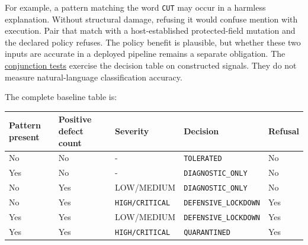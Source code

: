\documentclass[
  11pt,
]{article}
\newcommand{\passthrough}[1]{#1}
\begin{document}
For example, a pattern matching the word \passthrough{\lstinline!CUT!}
may occur in a harmless explanation. Without structural damage, refusing
it would confuse mention with execution. Pair that match with a
host-established protected-field mutation and the declared policy
refuses. The policy benefit is plausible, but whether these two inputs
are accurate in a deployed pipeline remains a separate obligation. The
\href{https://github.com/dbccpage/the_symbol_game/blob/52cb5457f6c485ba548cfd292f6012a941ed22cf/pfp/tests/mssn_sn_demos/test_demo_immune_strict.py}{conjunction
tests} exercise the decision table on constructed signals. They do not
measure natural-language classification accuracy.

The complete baseline table is:

\begin{longtable}[]{@{}
  >{\raggedright\arraybackslash}p{}
  >{\raggedright\arraybackslash}p{}
  >{\raggedright\arraybackslash}p{}
  >{\raggedright\arraybackslash}p{}
  >{\raggedright\arraybackslash}p{}@{}}
\toprule\noalign{}
\begin{minipage}[b]{\linewidth}\raggedright
Pattern present
\end{minipage} & \begin{minipage}[b]{\linewidth}\raggedright
Positive defect count
\end{minipage} & \begin{minipage}[b]{\linewidth}\raggedright
Severity
\end{minipage} & \begin{minipage}[b]{\linewidth}\raggedright
Decision
\end{minipage} & \begin{minipage}[b]{\linewidth}\raggedright
Refusal
\end{minipage} \\
\midrule\noalign{}
\endhead
\bottomrule\noalign{}
\endlastfoot
No & No & - & \passthrough{\lstinline!TOLERATED!} & No \\
Yes & No & - & \nolinkurl{DIAGNOSTIC_ONLY} & No \\
No & Yes & LOW/MEDIUM & \nolinkurl{DIAGNOSTIC_ONLY} & No \\
No & Yes & \nolinkurl{HIGH/CRITICAL} & \nolinkurl{DEFENSIVE_LOCKDOWN} &
Yes \\
Yes & Yes & LOW/MEDIUM & \nolinkurl{DEFENSIVE_LOCKDOWN} & Yes \\
Yes & Yes & \nolinkurl{HIGH/CRITICAL} &
\passthrough{\lstinline!QUARANTINED!} & Yes \\
\end{longtable}
\end{document}
